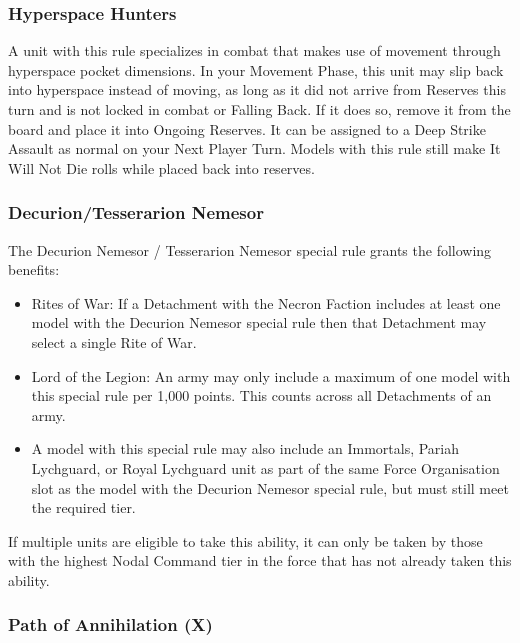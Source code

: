\begin{multicols}{2}
\subsubsection{Hyperspace Hunters} \label{Hyperspace Hunters}

A unit with this rule specializes in combat that makes use of movement through hyperspace pocket dimensions. In your Movement Phase, this unit may slip back into hyperspace instead of moving, as long as it did not arrive from Reserves this turn and is not locked in combat or Falling Back. If it does so, remove it from the board and place it into Ongoing Reserves. It can be assigned to a Deep Strike Assault as normal on your Next Player Turn. Models with this rule still make It Will Not Die rolls while placed back into reserves.

\subsubsection{Decurion/Tesserarion Nemesor} \label{Decurion Nemesor} \label{Tesserarion Nemesor}

The Decurion Nemesor / Tesserarion Nemesor special rule grants the following benefits:

\begin{itemize}
	\itemsep 0pt
	\item Rites of War: If a Detachment with the Necron Faction includes at least one model with the Decurion Nemesor special rule then that Detachment may select a single Rite of War. 
	\item Lord of the Legion: An army may only include a maximum of one model with this special rule per 1,000 points. This counts across all Detachments of an army.
	\item A model with this special rule may also include an Immortals, Pariah Lychguard, or Royal Lychguard unit as part of the same Force Organisation slot as the model with the Decurion Nemesor special rule, but must still meet the required  tier.
\end{itemize}

If multiple units are eligible to take this ability, it can only be taken by those with the highest Nodal Command tier in the force that has not already taken this ability. 

\subsubsection{Path of Annihilation (X)} \label{Path of Annihilation}


\end{multicols}
